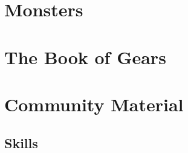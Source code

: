 \documentclass[9pt]{report}
\begin{document}
\chapter{Monsters}





\appendix

\chapter{The Book of Gears}


\chapter{Community Material}


\section{Skills}


%


\end{document}
